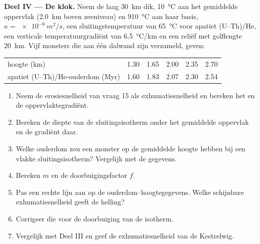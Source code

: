 \begin{problem}
\medskip\noindent\textbf{Deel IV --- De klok.}
Neem de laag \qty{30}{km} dik, \qty{10}{\celsius} aan het gemiddelde oppervlak
(\qty{2.0}{km} boven zeeniveau) en \qty{910}{\celsius} aan haar basis, $\kappa
= \qty{e-6}{m^2/s}$, een sluitingstemperatuur van \qty{65}{\celsius} voor apatiet
(U--Th)/He, een verticale temperatuurgradiënt van \qty{6.5}{\celsius/km} en een reliëf met
golflengte \qty{20}{km}. Vijf monsters die aan één dalwand zijn verzameld, geven:
\begin{center}
\small
\begin{tabular}{lccccc}
\hline
hoogte (\unit{km}) & 1.30 & 1.65 & 2.00 & 2.35 & 2.70 \\
apatiet (U--Th)/He-ouderdom (\unit{Myr}) & 1.60 & 1.83 & 2.07 & 2.30 & 2.54 \\
\hline
\end{tabular}
\end{center}
\begin{enumerate}[resume]
  \item Neem de erosiesnelheid van vraag 15 als exhumatiesnelheid en bereken
        het  en de oppervlaktegradiënt.
  \item Bereken de diepte van de sluitingsisotherm onder het gemiddelde oppervlak en
        de gradiënt daar.
  \item Welke ouderdom zou een monster op de gemiddelde hoogte hebben bij een vlakke
        sluitingsisotherm? Vergelijk met de gegevens.
  \item Bereken $m$ en de doorbuigingsfactor $f$.
  \item Pas een rechte lijn aan op de ouderdom--hoogtegegevens. Welke schijnbare
        exhumatiesnelheid geeft de helling?
  \item Corrigeer die voor de doorbuiging van de isotherm.
  \item Vergelijk met Deel III en geef de exhumatiesnelheid van de
        Kestrelwig.
\end{enumerate}
\end{problem}
